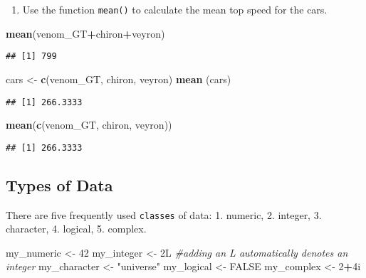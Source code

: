 \documentclass[
]{article}
\newenvironment{Shaded}{\begin{snugshade}}{\end{snugshade}}
\newcommand{\CommentTok}[1]{\textcolor[rgb]{0.56,0.35,0.01}{\textit{#1}}}
\newcommand{\ConstantTok}[1]{\textcolor[rgb]{0.56,0.35,0.01}{#1}}
\newcommand{\DecValTok}[1]{\textcolor[rgb]{0.00,0.00,0.81}{#1}}
\newcommand{\FunctionTok}[1]{\textcolor[rgb]{0.13,0.29,0.53}{\textbf{#1}}}
\newcommand{\NormalTok}[1]{#1}
\newcommand{\OtherTok}[1]{\textcolor[rgb]{0.56,0.35,0.01}{#1}}
\newcommand{\SpecialCharTok}[1]{\textcolor[rgb]{0.81,0.36,0.00}{\textbf{#1}}}
\newcommand{\StringTok}[1]{\textcolor[rgb]{0.31,0.60,0.02}{#1}}
\providecommand{\tightlist}{%
  \setlength{\itemsep}{0pt}\setlength{\parskip}{0pt}}
\begin{document}
\begin{enumerate}
\def\labelenumi{\arabic{enumi}.}
\setcounter{enumi}{2}
\tightlist
\item
  Use the function \texttt{mean()} to calculate the mean top speed for
  the cars.
\end{enumerate}

\begin{Shaded}
\begin{Highlighting}[]
\FunctionTok{mean}\NormalTok{(venom\_GT}\SpecialCharTok{+}\NormalTok{chiron}\SpecialCharTok{+}\NormalTok{veyron)}
\end{Highlighting}
\end{Shaded}

\begin{verbatim}
## [1] 799
\end{verbatim}

\begin{Shaded}
\begin{Highlighting}[]
\NormalTok{cars }\OtherTok{\textless{}{-}} \FunctionTok{c}\NormalTok{(venom\_GT, chiron, veyron)}
\FunctionTok{mean}\NormalTok{ (cars)}
\end{Highlighting}
\end{Shaded}

\begin{verbatim}
## [1] 266.3333
\end{verbatim}

\begin{Shaded}
\begin{Highlighting}[]
\FunctionTok{mean}\NormalTok{(}\FunctionTok{c}\NormalTok{(venom\_GT, chiron, veyron))}
\end{Highlighting}
\end{Shaded}

\begin{verbatim}
## [1] 266.3333
\end{verbatim}

\hypertarget{types-of-data}{%
\subsection{Types of Data}\label{types-of-data}}

There are five frequently used \texttt{classes} of data: 1. numeric, 2.
integer, 3. character, 4. logical, 5. complex.

\begin{Shaded}
\begin{Highlighting}[]
\NormalTok{my\_numeric }\OtherTok{\textless{}{-}} \DecValTok{42}
\NormalTok{my\_integer }\OtherTok{\textless{}{-}}\NormalTok{ 2L }\CommentTok{\#adding an L automatically denotes an integer}
\NormalTok{my\_character }\OtherTok{\textless{}{-}} \StringTok{"universe"}
\NormalTok{my\_logical }\OtherTok{\textless{}{-}} \ConstantTok{FALSE}
\NormalTok{my\_complex }\OtherTok{\textless{}{-}} \DecValTok{2}\SpecialCharTok{+}\NormalTok{4i}
\end{Highlighting}
\end{Shaded}
\end{document}
